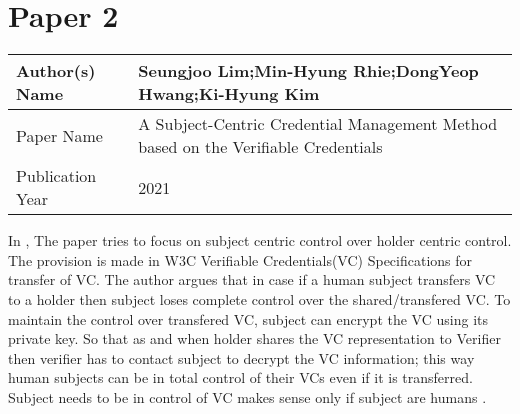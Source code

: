 \section{Paper 2}
    \begin{center}
    \begin{tabular}{ | m{5em} | m{25em} |} 
      \hline
      Author(s) Name & Seungjoo Lim;Min-Hyung Rhie;DongYeop Hwang;Ki-Hyung Kim \\ 
      \hline
      Paper Name & A Subject-Centric Credential Management Method based on the Verifiable Credentials \\ 
      \hline
      Publication Year & 2021 \\ 
      \hline
    \end{tabular}
    \end{center}
    In \cite{9333857}, The paper tries to focus on subject centric control over holder centric control. The provision is made in W3C Verifiable Credentials(VC) Specifications for transfer of VC. The author argues that in case if a human subject transfers VC to a holder then subject loses complete control over the shared/transfered VC. To maintain the control over transfered VC, subject can encrypt the VC using its private key. So that as and when holder shares the VC representation to Verifier then verifier has to contact subject to decrypt the VC information; this way human subjects can be in total control of their VCs even if it is transferred. Subject needs to be in control of VC makes sense only if subject are humans \cite{9333857}.
